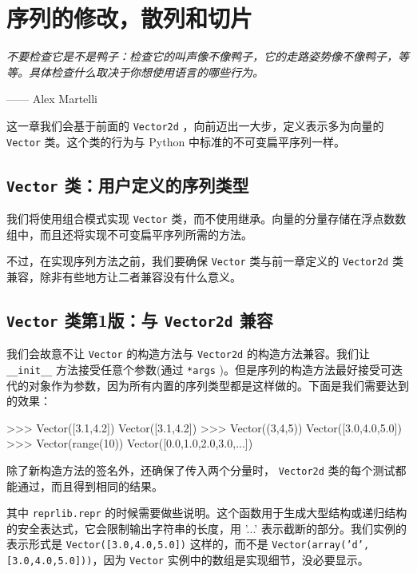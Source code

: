 \section{序列的修改，散列和切片}

\textit{不要检查它是不是鸭子：检查它的叫声像不像鸭子，它的走路姿势像不像鸭子，等等。具体检查什么取决于你想使用语言的哪些行为。}

\hfill —— Alex Martelli

这一章我们会基于前面的 \texttt{Vector2d} ，向前迈出一大步，定义表示多为向量的 \texttt{Vector} 类。这个类的行为与 Python 中标准的不可变扁平序列一样。

\subsection{\texttt{Vector} 类：用户定义的序列类型}

我们将使用组合模式实现 \texttt{Vector} 类，而不使用继承。向量的分量存储在浮点数数组中，而且还将实现不可变扁平序列所需的方法。

不过，在实现序列方法之前，我们要确保 \texttt{Vector} 类与前一章定义的 \texttt{Vector2d} 类兼容，除非有些地方让二者兼容没有什么意义。

\subsection{\texttt{Vector} 类第1版：与 \texttt{Vector2d} 兼容}

我们会故意不让 \texttt{Vector} 的构造方法与 \texttt{Vector2d} 的构造方法兼容。我们让 \texttt{\_\_init\_\_} 方法接受任意个参数(通过 \texttt{*args} )。但是序列的构造方法最好接受可迭代的对象作为参数，因为所有内置的序列类型都是这样做的。下面是我们需要达到的效果：

\begin{python}
>>> Vector([3.1,4.2])
Vector([3.1,4.2])
>>> Vector((3,4,5))
Vector([3.0,4.0,5.0])
>>> Vector(range(10))
Vector([0.0,1.0,2.0,3.0,...])
\end{python}

除了新构造方法的签名外，还确保了传入两个分量时， \texttt{Vector2d} 类的每个测试都能通过，而且得到相同的结果。



其中 \texttt{reprlib.repr} 的时候需要做些说明。这个函数用于生成大型结构或递归结构的安全表达式，它会限制输出字符串的长度，用 '...' 表示截断的部分。我们实例的表示形式是 \texttt{Vector([3.0,4.0,5.0])} 这样的，而不是 \texttt{Vector(array('d',[3.0,4.0,5.0]))}，因为 \texttt{Vector} 实例中的数组是实现细节，没必要显示。

